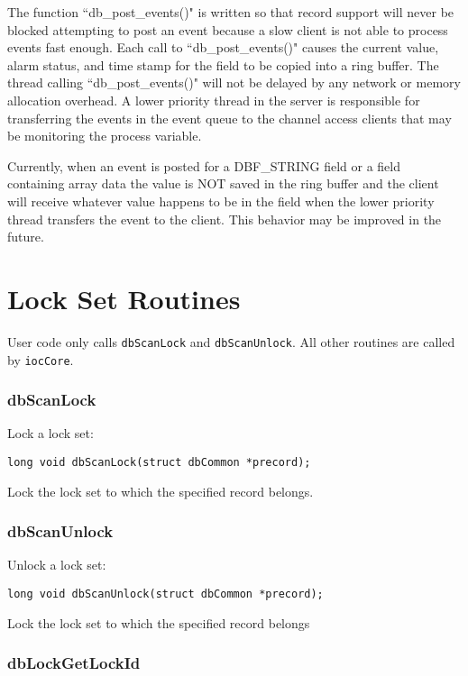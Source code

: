 The function ``db\_post\_events()" is written so that record support will never be blocked attempting to post an event 
because a slow client is not able to process events fast enough. Each call to ``db\_post\_events()" causes the current value, 
alarm status, and time stamp for the field to be copied into a ring buffer. The thread calling ``db\_post\_events()" will not be 
delayed by any network or memory allocation overhead. A lower priority thread in the server is responsible for 
transferring the events in the event queue to the channel access clients that may be monitoring the process variable.

Currently, when an event is posted for a DBF\_STRING field or a field containing array data the value is NOT saved in the 
ring buffer and the client will receive whatever value happens to be in the field when the lower priority thread transfers 
the event to the client. This behavior may be improved in the future.

\section{Lock Set Routines}

User code only calls \verb|dbScanLock| and \verb|dbScanUnlock|. All other routines are called by \verb|iocCore|.

\subsubsection{dbScanLock}

Lock a lock set:

\begin{verbatim}long void dbScanLock(struct dbCommon *precord);
\end{verbatim}Lock the lock set to which the specified record belongs.

\subsubsection{dbScanUnlock}

Unlock a lock set:

\begin{verbatim}long void dbScanUnlock(struct dbCommon *precord);
\end{verbatim}Lock the lock set to which the specified record belongs

\subsubsection{dbLockGetLockId}

